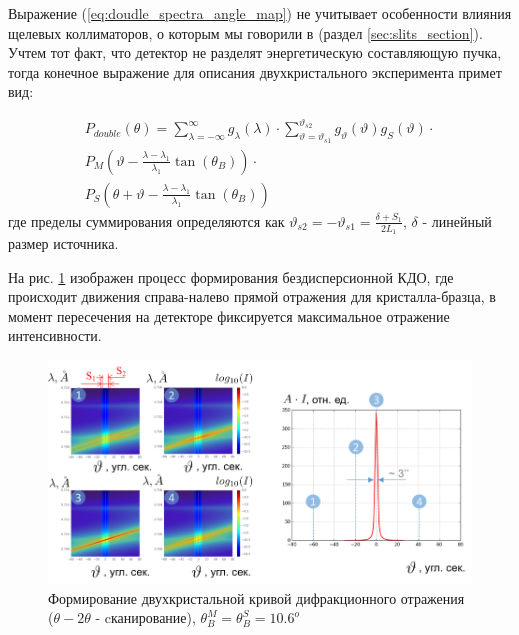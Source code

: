 Выражение (\ref{eq:doudle_spectra_angle_map}) не учитывает особенности влияния щелевых коллиматоров, о которым мы говорили в
(раздел \ref{sec:slits_section}). Учтем тот факт, что детектор не разделят энергетическую составляющую пучка, тогда
конечное выражение для описания двухкристального эксперимента примет вид:

\begin{eqnarray} \label{eq:doudle_spectra_angle_map_on_detector}
  P_{double}(\theta) = \sum_{\lambda = -\infty}^{\infty}g_{\lambda}(\lambda)\cdot
  \sum_{\vartheta = \vartheta_{s1}}^{\vartheta_{s2}} g_{\vartheta}(\vartheta) g_{S}(\vartheta) \cdot \nonumber \\
   P_M \left(\vartheta - \frac{\lambda - \lambda_1}{\lambda_1}\tan(\theta_B) \right) \cdot \nonumber \\
   P_S \left(\theta + \vartheta - \frac{\lambda - \lambda_1}{\lambda_1}\tan(\theta_B)\right)
 \end{eqnarray}
 \noindent
 где пределы суммирования определяются как $\vartheta_{s2} = - \vartheta_{s1} = \frac{\delta+S_1}{2L_1}$,
 $\delta$ - линейный размер источника.

 На рис. \ref{ris:double_crystal_form_kdo} изображен процесс формирования
 бездисперсионной КДО, где происходит движения справа-налево прямой отражения
 для кристалла-бразца, в момент пересечения на детекторе фиксируется максимальное
 отражение интенсивности.


 \begin{figure}[H]
   \centering
   \includegraphics[width=1\textwidth]{images/double_crystal_form_kdo.png}
   \caption{Формирование двухкристальной кривой дифракционного отражения ($\theta - 2\theta$ - cканирование),
   $\theta_B^M = \theta_B^S = 10.6^o$  }
   \label{ris:double_crystal_form_kdo}
 \end{figure}

